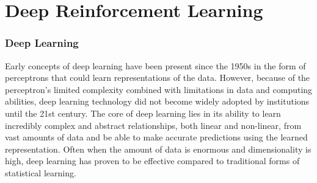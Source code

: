 \section{Deep Reinforcement Learning}

\subsubsection{Deep Learning}
Early concepts of deep learning have been present since the 1950s in the form of perceptrons that could learn representations of the data. However, because of the perceptron's limited complexity combined with limitations in data and computing abilities, deep learning technology did not become widely adopted by institutions until the 21st century. The core of deep learning lies in its ability to learn incredibly complex and abstract relationships, both linear and non-linear, from vast amounts of data and be able to make accurate predictions using the learned representation. Often when the amount of data is enormous and dimensionality is high, deep learning has proven to be effective compared to traditional forms of statistical learning.

